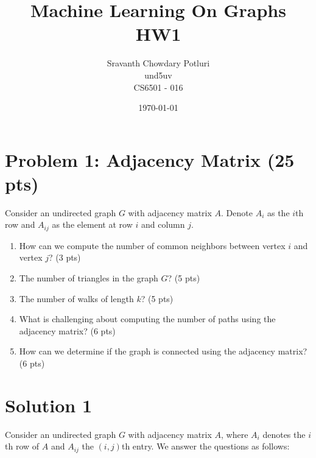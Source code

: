 \documentclass[a4paper,12pt]{article}
\title{Machine Learning On Graphs HW1}
\author{Sravanth Chowdary Potluri \\ und5uv \\ CS6501 - 016}
\date{\today}
\begin{document}
\maketitle

\section{Problem 1: Adjacency Matrix (25 pts)}

Consider an undirected graph \( G \) with adjacency matrix \( A \). Denote \( A_i \) as the \( i \)th row and \( A_{ij} \) as the element at row \( i \) and column \( j \).

\begin{enumerate}
    \item How can we compute the number of common neighbors between vertex \( i \) and vertex \( j \)? (3 pts)
    \item The number of triangles in the graph \( G \)? (5 pts)
    \item The number of walks of length \( k \)? (5 pts)
    \item What is challenging about computing the number of paths using the adjacency matrix? (6 pts)
    \item How can we determine if the graph is connected using the adjacency matrix? (6 pts)
\end{enumerate}

\section*{Solution 1}

Consider an undirected graph \( G \) with adjacency matrix \( A \), where \( A_i \) denotes the \( i \)th row of \( A \) and \( A_{ij} \) the \((i,j)\)th entry. We answer the questions as follows:
\end{document}

